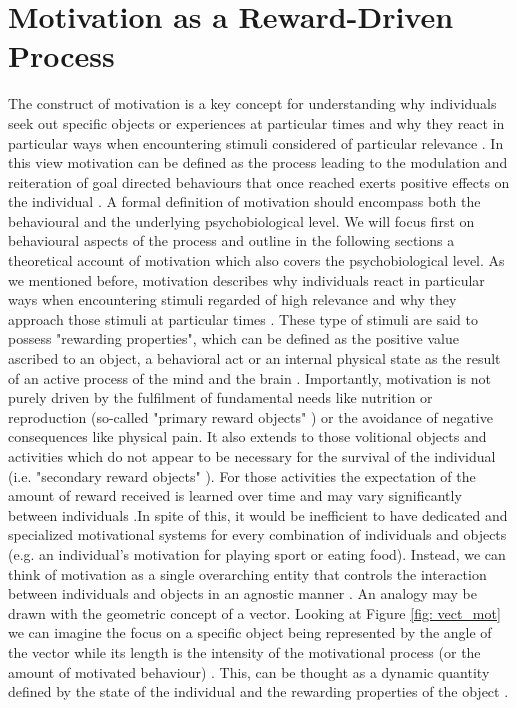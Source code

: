 \section{Motivation as a Reward-Driven Process}
\label{motivation}
The construct of motivation is a key concept for understanding why individuals seek out specific objects or experiences at particular times and why they react in particular ways when encountering stimuli considered of particular relevance \cite{berridge2004motivation}. In this view motivation can be defined as the process leading to the modulation and reiteration of goal directed behaviours that once reached exerts positive effects on the individual \cite{simpson2016behavioral}. A formal definition of motivation should encompass both the behavioural and the underlying psychobiological level. We will focus first on behavioural aspects of the process and outline in the following sections a theoretical account of motivation which also covers the psychobiological level. As we mentioned before, motivation describes why individuals react in particular ways when encountering stimuli regarded of high relevance and why they approach those stimuli at particular times \cite{berridge2004motivation}. These type of stimuli are said to possess "rewarding properties", which can be defined as the positive value ascribed to an object, a behavioral act or an internal physical state as the result of an active process of the mind and the brain \cite{schultz1997neural,berridge2008affective}. Importantly, motivation is not purely driven by the fulfilment of fundamental needs like nutrition or reproduction (so-called "primary reward objects" \cite{schultz2000reward}) or the avoidance of negative consequences like physical pain. It also extends to those volitional objects and activities which do not appear to be necessary for the survival of the individual (i.e. "secondary reward objects" \cite{berridge2008affective,sescousse2013processing}). For those activities the expectation of the amount of reward received is learned over time and may vary significantly between individuals \cite{berridge2008affective,simpson2016behavioral}.In spite of this, it would be inefficient to have dedicated and specialized motivational systems for every combination of individuals and objects (e.g. an individual's motivation for playing sport or eating food). Instead, we can think of motivation as a single overarching entity that controls the interaction between individuals and objects in an agnostic manner \cite{simpson2016behavioral}. An analogy may be drawn with the geometric concept of a vector. Looking at Figure \ref{fig: vect_mot} we can imagine the focus on a specific object being represented by the angle of the vector while its length is the intensity of the motivational process (or the amount of motivated behaviour) \cite{simpson2016behavioral}. This, can be thought as a dynamic quantity defined by the state of the individual and the rewarding properties of the object \cite{toates1994comparing,berridge2004motivation,zhang2009neural}.
